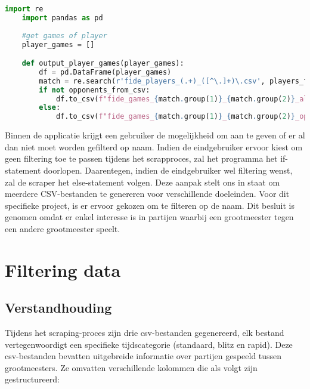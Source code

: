 \begin{lstlisting}[language=Python]
    import re
    import pandas as pd
    
    #get games of player
    player_games = []

    def output_player_games(player_games):
        df = pd.DataFrame(player_games)
        match = re.search(r'fide_players_(.+)_([^\.]+)\.csv', players_file_name)
        if not opponents_from_csv:
            df.to_csv(f"fide_games_{match.group(1)}_{match.group(2)}_all.csv", index=False)
        else:
            df.to_csv(f"fide_games_{match.group(1)}_{match.group(2)}_oppfromcsv.csv", index=False)
\end{lstlisting}

Binnen de applicatie krijgt een gebruiker de mogelijkheid om aan te geven of er al dan niet moet worden gefilterd op naam. Indien de eindgebruiker ervoor kiest om geen filtering toe te passen tijdens het scrapproces, zal het programma het if-statement doorlopen. Daarentegen, indien de eindgebruiker wel filtering wenst, zal de scraper het else-statement volgen. Deze aanpak stelt ons in staat om meerdere CSV-bestanden te genereren voor verschillende doeleinden. Voor dit specifieke project, is er ervoor gekozen om te filteren op de naam. Dit besluit is genomen omdat er enkel interesse is in partijen waarbij een grootmeester tegen een andere grootmeester speelt.

\section{Filtering data}

\subsection{Verstandhouding}

Tijdens het scraping-proces zijn drie csv-bestanden gegenereerd, elk bestand vertegenwoordigt een specifieke tijdscategorie (standaard, blitz en rapid). Deze csv-bestanden bevatten uitgebreide informatie over partijen gespeeld tussen grootmeesters. Ze omvatten verschillende kolommen die als volgt zijn gestructureerd:

